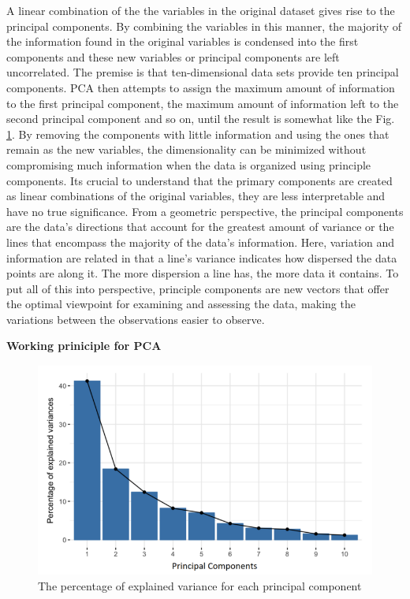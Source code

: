 A linear combination of the the variables in the original dataset gives rise to the principal components.  By combining the variables in this manner, the majority of the information found in the original variables is condensed into the first components and these new variables or principal components are left uncorrelated. The premise is that ten-dimensional data sets provide ten principal components. PCA then attempts to assign the maximum amount of information to the first principal component, the maximum amount of information left to the second principal component and so on, until the result is somewhat like the Fig. \ref{fig:pca_variables}. By removing the components with little information and using the ones that remain as the new variables, the dimensionality can be minimized without compromising much information when the data is organized using principle components. Its crucial to understand that the primary components are created as linear combinations of the original variables, they are less interpretable and have no true significance. From a geometric perspective, the principal components are the data's directions that account for the greatest amount of variance or the lines that encompass the majority of the data's information. Here, variation and information are related in that a line's variance indicates how dispersed the data points are along it. The more dispersion a line has, the more data it contains. To put all of this into perspective, principle components are new vectors that offer the optimal viewpoint for examining and assessing the data, making the variations between the observations easier to observe.\cite{abdi2010principal} 

\vspace{5mm}

\textbf{Working priniciple for \ac{PCA}}\\
\begin{figure}[t] 
  \centering
  \includegraphics[width=350pt,height=200pt]{pictures/pca_variables.PNG}
  \caption{The percentage of explained variance for each principal component}
  \label{fig:pca_variables}
\end{figure}

